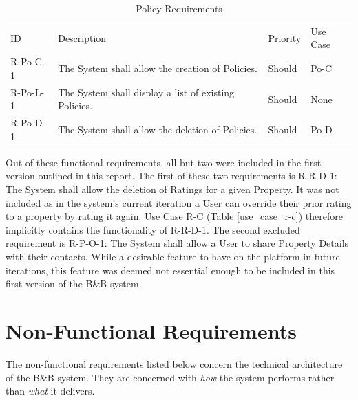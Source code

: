 \begin{table}[H]
    \centering
    \begin{tabular}{| p{1.8cm} | p{9.7cm} | P{1.5cm} | P{2cm} | }
        \hline
          \\ \hline
         ID      & Description & Priority & Use Case \\ \hline
        R-Po-C-1 & The System shall allow the creation of Policies. & Should & Po-C \\ \hline
        R-Po-L-1 & The System shall display a list of existing Policies. & Should & None \\ \hline
        R-Po-D-1 & The System shall allow the deletion of Policies. & Should & Po-D \\ \hline
    \end{tabular}
    \caption{Policy Requirements}
    \label{requirements:policies}
\end{table}

Out of these functional requirements, all but two were included in the first version outlined in this report. The first of these two requirements is R-R-D-1: The System shall allow the deletion of Ratings for a given Property. It was not included as in the system's current iteration a User can override their prior rating to a property by rating it again. Use Case R-C (Table \ref{use_case_r-c}) therefore implicitly contains the functionality of R-R-D-1. The second excluded requirement is R-P-O-1: The System shall allow a User to share Property Details with their contacts. While a desirable feature to have on the platform in future iterations, this feature was deemed not essential enough to be included in this first version of the B\&B system.

\section{Non-Functional Requirements}

The non-functional requirements listed below concern the technical architecture of the B\&B system. They are concerned with \textit{how} the system performs rather than \textit{what} it delivers.

